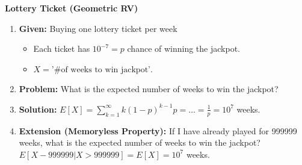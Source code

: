 \begin{example} \textbf{Lottery Ticket (Geometric RV)}
    \begin{enumerate}
        \item \textbf{Given:} Buying one lottery ticket per week
        \begin{itemize}
            \item Each ticket has $10^{-7} = p$ chance of winning the jackpot.
            \item $X = \text{'\# of weeks to win jackpot'}$.
        \end{itemize}
        \item \textbf{Problem:} What is the expected number of weeks to win the jackpot?
        \item \textbf{Solution:} $E[X] = \sum_{k=1}^{\infty} k(1 - p)^{k-1}p = \ldots = \frac{1}{p} = 10^7$ weeks.
        \item \textbf{Extension (Memoryless Property):} If I have already played for 999999 weeks, what is the expected number of weeks to win the jackpot? $E[X-999999|X>999999] = E[X] = 10^7$ weeks.
    \end{enumerate}
\end{example}